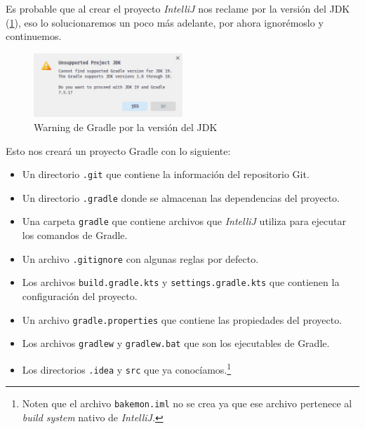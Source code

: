   Es probable que al crear el proyecto \textit{IntelliJ} nos reclame por la versión del JDK
  (\cref{fig:gradle-jdk}), eso lo solucionaremos un poco más adelante, por ahora ignorémoslo y 
  continuemos.

  \begin{figure}[ht!]
    \centering
    \includegraphics[width=0.5\textwidth]{img/oop/tdd/gradle/gradle-jdk.png}
    \caption{Warning de Gradle por la versión del JDK}
    \label{fig:gradle-jdk}
  \end{figure}

  Esto nos creará un proyecto Gradle con lo siguiente:

  \begin{itemize}
    \item Un directorio \texttt{.git} que contiene la información del repositorio Git.
    \item Un directorio \texttt{.gradle} donde se almacenan las dependencias del proyecto.
    \item Una carpeta \texttt{gradle} que contiene archivos que \textit{IntelliJ} utiliza para
      ejecutar los comandos de Gradle.
    \item Un archivo \texttt{.gitignore} con algunas reglas por defecto.
    \item Los archivos \texttt{build.gradle.kts} y \texttt{settings.gradle.kts} que contienen la 
      configuración del proyecto.
    \item Un archivo \texttt{gradle.properties} que contiene las propiedades del proyecto.
    \item Los archivos \texttt{gradlew} y \texttt{gradlew.bat} que son los ejecutables de Gradle.
    \item Los directorios \texttt{.idea} y \texttt{src} que ya conocíamos.\footnote{
      Noten que el archivo \texttt{bakemon.iml} no se crea ya que ese archivo pertenece al
      \textit{build system} nativo de \textit{IntelliJ}.
    }
  \end{itemize}

